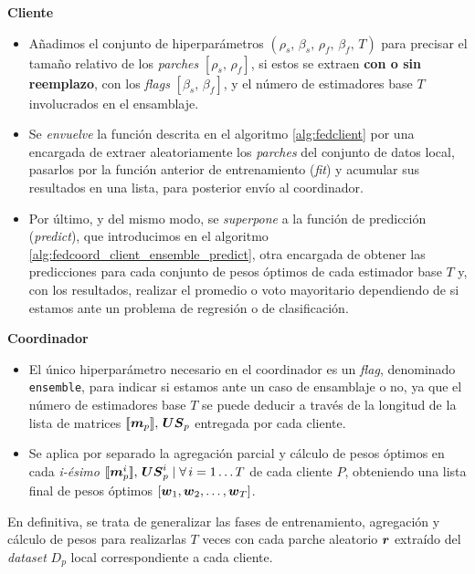 \documentclass[00-Trabajo_Final.tex]{subfiles}
\begin{document}
\vspace{0.5em}

\noindent \textbf{Cliente}
\begin{itemize}[noitemsep]
    \item Añadimos el conjunto de hiperparámetros $(\rho_s,\,\beta_s,\,\rho_f,\,\beta_f,\,T)$ para precisar el tamaño relativo de los \textit{parches} $[\rho_s,\,\rho_f]$, si estos se extraen \textbf{con o sin reemplazo}, con los \textit{flags} $[\beta_s,\,\beta_f]$, y el número de estimadores base $T$ involucrados en el ensamblaje.
    \item Se \textit{envuelve} la función descrita en el algoritmo \ref{alg:fedclient} por una encargada de extraer aleatoriamente los \textit{parches} del conjunto de datos local, pasarlos por la función anterior de entrenamiento (\textit{fit}) y acumular sus resultados en una lista, para posterior envío al coordinador.
    \item Por último, y del mismo modo, se \textit{superpone} a la función de predicción (\textit{predict}), que introducimos en el algoritmo \ref{alg:fedcoord_client_ensemble_predict}, otra encargada de obtener las predicciones para cada conjunto de pesos óptimos de cada estimador base $T$ y, con los resultados, realizar el promedio o voto mayoritario dependiendo de si estamos ante un problema de regresión o de clasificación.
\end{itemize}

\vspace{0.5em}

\noindent \textbf{Coordinador}
\begin{itemize}[noitemsep]
    \item El único hiperparámetro necesario en el coordinador es un \textit{flag}, denominado \verb|ensemble|, para indicar si estamos ante un caso de ensamblaje o no, ya que el número de estimadores base $T$ se puede deducir a través de la longitud de la lista de matrices $[\![\boldsymbol{m}_p]\!],\,\boldsymbol{US}_p$ entregada por cada cliente.
    \item Se aplica por separado la agregación parcial y cálculo de pesos óptimos en cada \textit{i-ésimo} $[\![\boldsymbol{m}_p^i]\!],\,\boldsymbol{US}_p^i \mid \forall \, i = 1\dots T$ de cada cliente $P$, obteniendo una lista final de pesos óptimos $[\boldsymbol{w}_1, \boldsymbol{w}_2, \dots, \boldsymbol{w}_T]$.
\end{itemize}

En definitiva, se trata de generalizar las fases de entrenamiento,  agregación y cálculo de pesos para realizarlas $T$ veces con cada parche aleatorio $\boldsymbol{r}$ extraído del \textit{dataset} $D_p$ local correspondiente a cada cliente.
\end{document}
